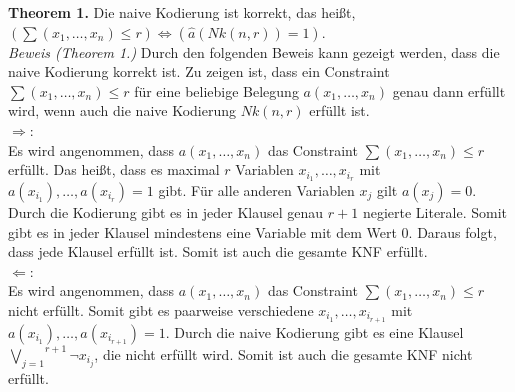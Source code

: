 \documentclass[a4,abstract=on]{scrartcl}
\begin{document}
\textbf{Theorem 1.} Die naive Kodierung ist korrekt, das heißt, $(\sum (x_1, \dots, x_n) \leq r) \Leftrightarrow (\hat{a} (Nk(n,r)) = 1)$.\\
\newline
\textit{Beweis (Theorem 1.)} Durch den folgenden Beweis kann gezeigt werden, dass die naive Kodierung korrekt ist. Zu zeigen ist, dass ein Constraint $\sum(x_1, \dots,x_n) \leq r$ für eine beliebige Belegung $a(x_1, \dots ,x_n)$ genau dann erfüllt wird, wenn auch die naive Kodierung $Nk(n, r)$ erfüllt ist.\\
\glqq$\Rightarrow$\grqq:\\
Es wird angenommen, dass $a(x_1, \dots ,x_n)$ das Constraint $\sum(x_1, \dots,x_n) \leq r$ erfüllt. Das heißt, dass es maximal $r$ Variablen $x_{i_1}, \dots, x_{i_r}$ mit\\
 $a(x_{i_1}), \dots, a(x_{i_r}) = 1$ gibt. Für alle anderen Variablen $x_j$ gilt $a(x_j) = 0$. Durch die Kodierung gibt es in jeder Klausel genau $r+1$ negierte Literale. Somit gibt es in jeder Klausel mindestens eine Variable mit dem Wert $0$. Daraus folgt, dass jede Klausel erfüllt ist. Somit ist auch die gesamte KNF erfüllt.\\
\glqq$\Leftarrow$\grqq:\\
Es wird angenommen, dass $a(x_1, \dots ,x_n)$ das Constraint $\sum(x_1, \dots,x_n) \leq r$ nicht erfüllt. Somit gibt es paarweise verschiedene $x_{i_1}, \dots, x_{i_{r+1}}$ mit $a(x_{i_1}), \dots ,a(x_{i_{r+1}}) = 1$. Durch die naive Kodierung gibt es eine Klausel $\overset{r+1}{\underset{j=1}{\bigvee}} {\neg x_{i_j}}$, die nicht erfüllt wird. Somit ist auch die gesamte KNF nicht erfüllt.\\
 \qedsymbol
\end{document}

